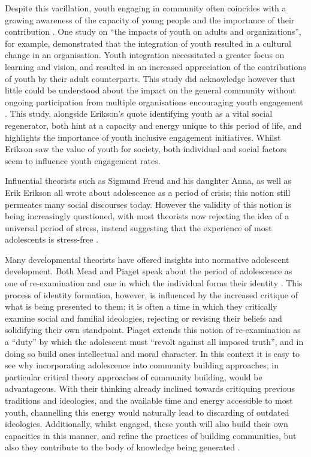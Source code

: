 Despite this vacillation, youth engaging in community often coincides with a growing awareness of the capacity of young people and the importance of their contribution \citep{Holdsworth2000, Holdsworth2007, Wyn2011}. One study on “the impacts of youth on adults and organizations”, for example, demonstrated that the integration of youth resulted in a cultural change in an organisation. Youth integration necessitated a greater focus on learning and vision, and resulted in an increased appreciation of the contributions of youth by their adult counterparts. This study did acknowledge however that little could be understood about the impact on the general community without ongoing participation from multiple organisations encouraging youth engagement \citep{Zeldin2000}. This study, alongside Erikson’s quote identifying youth as a vital social regenerator, both hint at a capacity and energy unique to this period of life, and highlights the importance of youth inclusive engagement initiatives. Whilst Erikson saw the value of youth for society, both individual and social factors seem to influence youth engagement rates. 

Influential theorists such as Sigmund Freud and his daughter Anna, as well as Erik Erikson all wrote about adolescence as a period of crisis; this notion still permeates many social discourses today. However the validity of this notion is being increasingly questioned, with most theorists now rejecting the idea of a universal period of stress, instead suggesting that the experience of most adolescents is stress-free \citep[Bandura 1964 and Offer 1969 according to][]{Muuss1975}. 

Many developmental theorists have offered insights into normative adolescent development. Both Mead and Piaget speak about the period of adolescence as one of re-examination and one in which the individual forms their identity \citep{Muuss1975}. This process of identity formation, however, is influenced by the increased critique of what is being presented to them; it is often a time in which they critically examine social and familial ideologies, rejecting or revising their beliefs and solidifying their own standpoint. Piaget extends this notion of re-examination as a “duty” by which the adolescent must “revolt against all imposed truth”, and in doing so build ones intellectual and moral character. In this context it is easy to see why incorporating adolescence into community building approaches, in particular critical theory approaches of community building, would be advantageous. With their thinking already inclined towards critiquing previous traditions and ideologies, and the available time and energy accessible to most youth, channelling this energy would naturally lead to discarding of outdated ideologies. Additionally, whilst engaged, these youth will also build their own capacities in this manner, and refine the practices of building communities, but also they contribute to the body of knowledge being generated \citep{Muuss1975}. 



